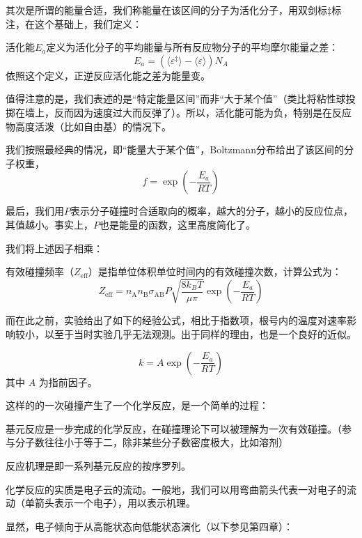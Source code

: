 其次是所谓的能量合适，我们称能量在该区间的分子为活化分子，用双剑标$\ddagger$标注，在这个基础上，我们定义：

\begin{definition}[Tolman活化能]
活化能$E_a$定义为活化分子的平均能量与所有反应物分子的平均摩尔能量之差：$$ E_a = \left(\langle \varepsilon ^\ddagger \rangle - \langle \varepsilon  \rangle\right)N_A$$
依照这个定义，正逆反应活化能之差为能量变。
\end{definition}

值得注意的是，我们表述的是“特定能量区间”而非“大于某个值”（类比将粘性球投掷在墙上，反而因为速度过大而反弹了）。所以，活化能可能为负，特别是在反应物高度活泼（比如自由基）的情况下。

我们按照最经典的情况，即“能量大于某个值”，Boltzmann分布给出了该区间的分子权重，$$f = \exp (-\frac{E_a}{RT})$$

最后，我们用$P$表示分子碰撞时合适取向的概率，越大的分子，越小的反应位点，其值越小。事实上，$P$也是能量的函数，这里高度简化了。

我们将上述因子相乘：

\begin{proposition}[有效碰撞频率]
有效碰撞频率（$Z_{\text{eff}}$）是指单位体积单位时间内的有效碰撞次数，计算公式为：
$$Z_{\text{eff}} = n_{\text{A}} n_{\text{B}} \sigma_{\text{AB}} P \sqrt{\frac{8 k_B T}{\mu \pi} } \exp (-\frac{E_a}{RT})$$
\end{proposition}

而在此之前，实验给出了如下的经验公式，相比于指数项，根号内的温度对速率影响较小，以至于当时实验几乎无法观测。出于同样的理由，也是一个良好的近似。

\begin{proposition}[Arrhenius经验方程]
$$k = A\exp\left(-\frac{E_a}{RT}\right)$$
其中 $A$ 为指前因子。
\end{proposition}


这样的的一次碰撞产生了一个化学反应，是一个简单的过程：

\begin{definition}[基元反应与反应机理]
基元反应是一步完成的化学反应，在碰撞理论下可以被理解为一次有效碰撞。（参与分子数往往小于等于二，除非某些分子数密度极大，比如溶剂）

反应机理是即一系列基元反应的按序罗列。
\end{definition}

化学反应的实质是电子云的流动。一般地，我们可以用弯曲箭头代表一对电子的流动（单箭头表示一个电子），用以表示机理。

显然，电子倾向于从高能状态向低能状态演化（以下参见第四章）：

